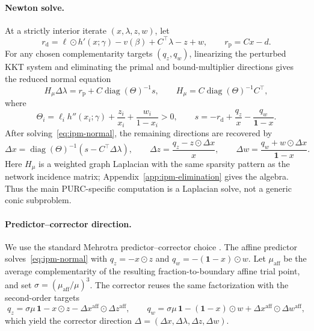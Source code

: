 \documentclass[12pt]{article}
\begin{document}
\paragraph{Newton solve.} At a strictly interior iterate $(x,\lambda,z,w)$, let
\[
    r_{\mathrm d}=\ell\odot h'(x;\gamma)-v(\beta)+C^\top\lambda-z+w,
    \qquad
    r_{\mathrm p}=Cx-d.
\]
For any chosen complementarity targets $(q_z,q_w)$, linearizing the perturbed KKT
system and eliminating the primal and bound-multiplier directions gives the reduced
normal equation
\begin{equation}\label{eq:ipm-normal}
    H_\mu\Delta\lambda
    = r_{\mathrm p}
      +C\operatorname{diag}(\Theta)^{-1}s,
    \qquad
    H_\mu=C\operatorname{diag}(\Theta)^{-1}C^\top,
\end{equation}
where
\[
    \Theta_i=\ell_i h''(x_i;\gamma)+\frac{z_i}{x_i}
        +\frac{w_i}{1-x_i}>0,
    \qquad
    s=-r_{\mathrm d}+\frac{q_z}{x}-\frac{q_w}{\mathbf 1-x}.
\]
After solving~\eqref{eq:ipm-normal}, the remaining directions are recovered by
\begin{equation}\label{eq:ipm-backsub}
    \Delta x=\operatorname{diag}(\Theta)^{-1}(s-C^\top\Delta\lambda),\qquad
    \Delta z=\frac{q_z-z\odot\Delta x}{x},\qquad
    \Delta w=\frac{q_w+w\odot\Delta x}{\mathbf 1-x}.
\end{equation}
Here $H_\mu$ is a weighted graph Laplacian with the same sparsity pattern as the
network incidence matrix; Appendix~\ref{app:ipm-elimination} gives the algebra.
Thus the main PURC-specific computation is a Laplacian solve, not a generic conic
subproblem.

\paragraph{Predictor--corrector direction.} We use the standard Mehrotra
predictor--corrector choice \citep{mehrotra1992implementation,wright1997primal}.
The affine predictor solves~\eqref{eq:ipm-normal} with
$q_z=-x\odot z$ and $q_w=-(\mathbf 1-x)\odot w$. Let
$\mu_{\mathrm{aff}}$ be the average complementarity of the resulting
fraction-to-boundary affine trial point, and set
$\sigma=(\mu_{\mathrm{aff}}/\mu)^3$. The corrector reuses the same factorization
with the second-order targets
\begin{equation}\label{eq:mehrotra-rhs}
    q_z = \sigma\mu\,\mathbf 1 - x\odot z
        - \Delta x^{\mathrm{aff}}\!\odot\Delta z^{\mathrm{aff}},
    \qquad
    q_w = \sigma\mu\,\mathbf 1 - (\mathbf 1-x)\odot w
        + \Delta x^{\mathrm{aff}}\!\odot\Delta w^{\mathrm{aff}},
\end{equation}
which yield the corrector direction $\Delta=(\Delta x,\Delta\lambda,\Delta z,\Delta w)$.
\end{document}
